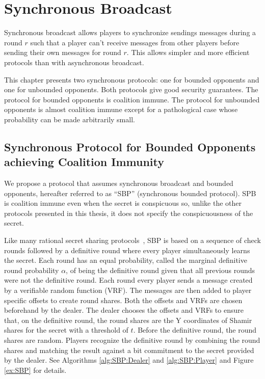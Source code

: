 \documentclass{dalcsthesis}
\begin{document}
\chapter{Synchronous Broadcast}
\label{chapter:Synchronous}

Synchronous broadcast allows players to synchronize sendings messages during a round $r$ such that a player can't receive messages from other players before sending their own messages for round $r$. This allows simpler and more efficient protocols than with asynchronous broadcast.

This chapter presents two synchronous protocols: one for bounded opponents and one for unbounded opponents. Both protocols give good security guarantees. The protocol for bounded opponents is coalition immune. The protocol for unbounded opponents is almost coalition immune except for a pathological case whose probability can be made arbitrarily small.



\section{Synchronous Protocol for Bounded Opponents achieving Coalition Immunity}

We propose a protocol that assumes synchronous broadcast and bounded opponents, hereafter referred to as ``SBP'' (synchronous bounded protocol). SPB is coalition immune even when the secret is conspicuous so, unlike the other protocols presented in this thesis, it does not specify the conspicuousness of the secret.

Like many rational secret sharing protocols~\cite{fuch10, halpern04, kol08}, SBP is based on a sequence of check rounds followed by a definitive round where every player simultaneously learns the secret. Each round has an equal probability, called the marginal definitive round probability $\alpha$, of being the definitive round given that all previous rounds were not the definitive round. Each round every player sends a message created by a verifiable random function (VRF). The messages are then added to player specific offsets to create round shares. Both the offsets and VRFs are chosen beforehand by the dealer. The dealer chooses the offsets and VRFs to ensure that, on the definitive round, the round shares are the Y coordinates of Shamir shares for the secret with a threshold of $t$. Before the definitive round, the round shares are random. Players recognize the definitive round by combining the round shares and matching the result against a bit commitment to the secret provided by the dealer. See Algorithms \ref{alg:SBP:Dealer} and \ref{alg:SBP:Player} and Figure \ref{ex:SBP} for details.
\end{document}
